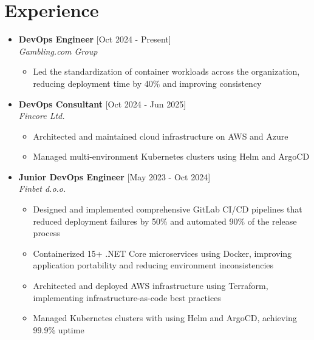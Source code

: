 \documentclass[12pt,a4paper]{moderncv}
\begin{document}
\makecvtitle

\vspace{-0.8em}
\section{Experience}

\begin{itemize}
	\item \textbf{DevOps Engineer} \hfill [Oct 2024 - Present]\\
	\textit{Gambling.com Group}

	\begin{itemize}
		\vspace{-0.75em}
		\setlength\itemsep{0.1em}
		\item Led the standardization of container workloads across the organization, reducing deployment time by 40\% and improving consistency
	\end{itemize}

	\item \textbf{DevOps Consultant} \hfill [Oct 2024 - Jun 2025]\\
	\textit{Fincore Ltd.}

	\begin{itemize}
		\vspace{-0.75em}
		\setlength\itemsep{0.1em}
		\item Architected and maintained cloud infrastructure on AWS and Azure
		\item Managed multi-environment Kubernetes clusters using Helm and ArgoCD
	\end{itemize}

	\item \textbf{Junior DevOps Engineer} \hfill [May 2023 - Oct 2024]\\
	\textit{Finbet d.o.o.}

	\begin{itemize}
		\vspace{-0.75em}
		\setlength\itemsep{0.1em}
		\item Designed and implemented comprehensive GitLab CI/CD pipelines that reduced deployment failures by 50\% and automated 90\% of the release process
		\item Containerized 15+ .NET Core microservices using Docker, improving application portability and reducing environment inconsistencies
		\item Architected and deployed AWS infrastructure using Terraform, implementing infrastructure-as-code best practices
		\item Managed Kubernetes clusters with using Helm and ArgoCD, achieving 99.9\% uptime
	\end{itemize}

\end{itemize}	
\end{document}
